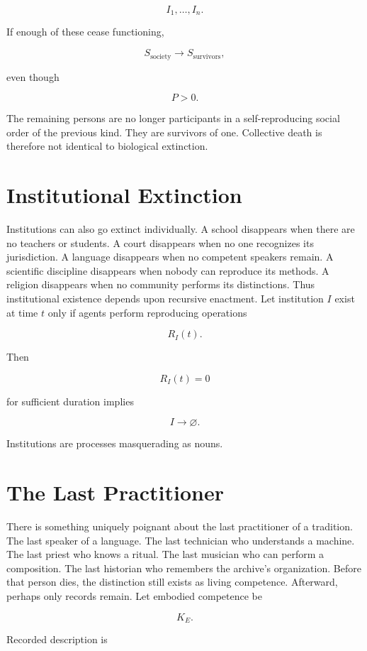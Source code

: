 \documentclass[11pt,oneside]{book}
\theoremstyle{definition}
\theoremstyle{remark}
\begin{document}
\[
I_1,\ldots,I_n.
\]

If enough of these cease functioning,

\[
S_{\mathrm{society}} \rightarrow S_{\mathrm{survivors}},
\]

even though

\[
P>0.
\]

The remaining persons are no longer participants in a self-reproducing social order of the previous
kind. They are survivors of one. Collective death is therefore not identical to biological
extinction.

\section{Institutional Extinction}

Institutions can also go extinct individually. A school disappears when there are no teachers or
students. A court disappears when no one recognizes its jurisdiction. A language disappears when no
competent speakers remain. A scientific discipline disappears when nobody can reproduce its methods.
A religion disappears when no community performs its distinctions. Thus institutional existence
depends upon recursive enactment. Let institution \(I\) exist at time \(t\) only if agents perform
reproducing operations

\[
R_I(t).
\]

Then

\[
R_I(t)=0
\]

for sufficient duration implies

\[
I\rightarrow\varnothing.
\]

Institutions are processes masquerading as nouns.

\section{The Last Practitioner}

There is something uniquely poignant about the last practitioner of a tradition. The last speaker of
a language. The last technician who understands a machine. The last priest who knows a ritual. The
last musician who can perform a composition. The last historian who remembers the archive's
organization. Before that person dies, the distinction still exists as living competence. Afterward,
perhaps only records remain. Let embodied competence be

\[
K_E.
\]

Recorded description is
\end{document}
